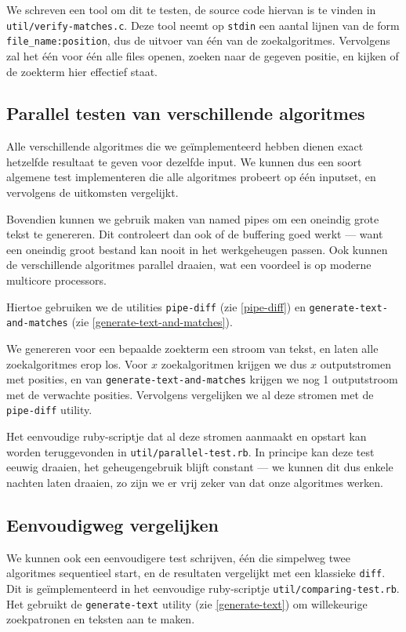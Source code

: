 \documentclass[a4paper,11pt]{article}
\begin{document}
We schreven een tool om dit te testen, de source code hiervan is te vinden in
\verb#util/verify-matches.c#. Deze tool neemt op \verb#stdin# een aantal lijnen
van de form \verb#file_name:position#, dus de uitvoer van \'e\'en van de
zoekalgoritmes. Vervolgens zal het \'e\'en voor \'e\'en alle files openen,
zoeken naar de gegeven positie, en kijken of de zoekterm hier effectief staat.

\subsection{Parallel testen van verschillende algoritmes}

Alle verschillende algoritmes die we ge\"implementeerd hebben dienen exact
hetzelfde resultaat te geven voor dezelfde input. We kunnen dus een soort
algemene test implementeren die alle algoritmes probeert op \'e\'en inputset, en
vervolgens de uitkomsten vergelijkt.

Bovendien kunnen we gebruik maken van named pipes om een oneindig grote tekst
te genereren. Dit controleert dan ook of de buffering goed werkt — want een
oneindig groot bestand kan nooit in het werkgeheugen passen. Ook kunnen de
verschillende algoritmes parallel draaien, wat een voordeel is op moderne
multicore processors.

Hiertoe gebruiken we de utilities \verb#pipe-diff# (zie \ref{pipe-diff}) en
\verb#generate-text-and-matches# (zie \ref{generate-text-and-matches}).

We genereren voor een bepaalde zoekterm een stroom van tekst, en laten
alle zoekalgoritmes erop los. Voor $x$ zoekalgoritmen krijgen we dus $x$
outputstromen met posities, en van \verb#generate-text-and-matches# krijgen we
nog 1 outputstroom met de verwachte posities. Vervolgens vergelijken we al deze
stromen met de \verb#pipe-diff# utility.

Het eenvoudige ruby-scriptje dat al deze stromen aanmaakt en opstart kan worden
teruggevonden in \verb#util/parallel-test.rb#. In principe kan deze test eeuwig
draaien, het geheugengebruik blijft constant — we kunnen dit dus enkele
nachten laten draaien, zo zijn we er vrij zeker van dat onze algoritmes werken.

\subsection{Eenvoudigweg vergelijken}
\label{comparing-test}

We kunnen ook een eenvoudigere test schrijven, \'e\'en die simpelweg twee
algoritmes sequentieel start, en de resultaten vergelijkt met een klassieke
\verb#diff#. Dit is ge\"implementeerd in het eenvoudige ruby-scriptje
\verb#util/comparing-test.rb#. Het gebruikt de \verb#generate-text# utility (zie
\ref{generate-text}) om willekeurige zoekpatronen en teksten aan te maken.
\end{document}
